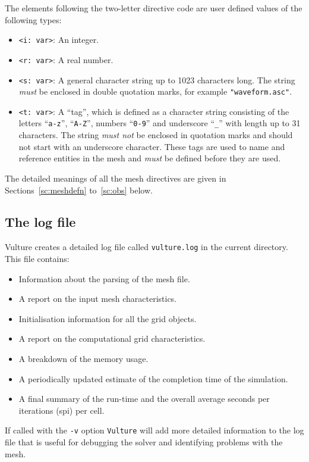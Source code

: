 \documentclass[onecolumn,a4paper]{article}
\numberwithin{equation}{section}
\begin{document}
The elements following the two-letter directive code are user defined values of the following types:
\begin{itemize}
 \item \texttt{<i:~var>}: An integer.
 \item \texttt{<r:~var>}: A real number.
 \item \texttt{<s:~var>}: A general character string up to 1023 characters long. The string 
 {\it must} be enclosed in double quotation marks, for example \texttt{"waveform.asc"}.
 \item \texttt{<t:~var>}: A ``tag'', which is defined as a character string consisting 
 of the letters ``\texttt{a-z}'', ``\texttt{A-Z}'', numbers ``\texttt{0-9}'' and underscore ``\texttt{\_}'' with length up to 31 characters.  The string 
 {\it must not} be enclosed in quotation marks and should not start with an underscore character. These tags are used to name and reference entities in 
 the mesh and {\it must} be defined before they are used.
\end{itemize}

The detailed meanings of all the mesh directives are given in Sections~\ref{sc:meshdefn} to~\ref{sc:obs} below.

\subsection{The log file}
\label{ssc:logfile}

Vulture creates a detailed log file called \texttt{vulture.log} in the current directory.
This file contains:
\begin{itemize}
 \item Information about the parsing of the mesh file.
 \item A report on the input mesh characteristics.
 \item Initialisation information for all the grid objects.
 \item A report on the computational grid characteristics.
 \item A breakdown of the memory usage.
 \item A periodically updated estimate of the completion time
 of the simulation.
 \item A final summary of the run-time and the overall average 
 seconds per iterations (spi) per cell.
\end{itemize}
If called with the \texttt{-v} option \texttt{Vulture} will add more
detailed information to the log file that is useful for debugging the
solver and identifying problems with the mesh. 
\end{document}
